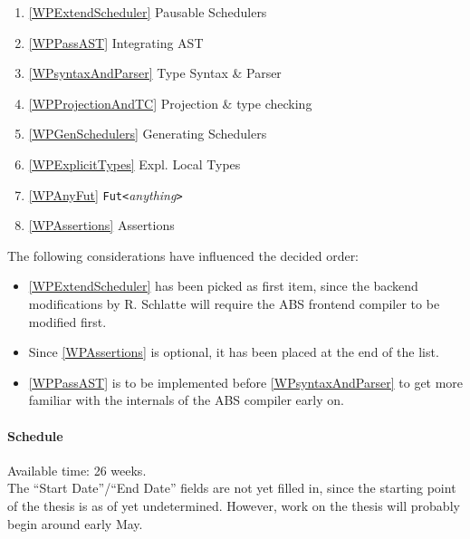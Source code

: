 \documentclass[paper=a4,nochapname,accentcolor=tud9c]{tudexercise}
\begin{document}
\begin{enumerate}[label=(\arabic*)]
  \item \label{orderExtendScheduler} \ref{WPExtendScheduler} Pausable Schedulers
  \item \label{orderPassAST} \ref{WPPassAST} Integrating AST
  \item \label{ordersyntaxAndParser} \ref{WPsyntaxAndParser} Type Syntax \& Parser
  \item \label{orderProjectionAndTC} \ref{WPProjectionAndTC} Projection \& type checking
  \item \label{orderGenSchedulers} \ref{WPGenSchedulers} Generating Schedulers
  \item \label{orderExplicitTypes} \ref{WPExplicitTypes} Expl. Local Types
  \item \label{orderAnyFut} \ref{WPAnyFut} \texttt{Fut<}\emph{anything}\texttt{>}
  \item \label{orderAssertions} \ref{WPAssertions} Assertions
\end{enumerate}

The following considerations have influenced the decided order:
\begin{itemize}
  \item \ref{WPExtendScheduler} has been picked as first item, since the
    backend modifications by R. Schlatte will require the ABS frontend compiler
    to be modified first.
  \item Since \ref{WPAssertions} is optional, it has been placed at the end of
    the list.
  \item \ref{WPPassAST} is to be implemented before \ref{WPsyntaxAndParser} to
    get more familiar with the internals of the ABS compiler early on.
\end{itemize}

\paragraph{Schedule}%
%
Available time: 26 weeks.
\\
The ``Start Date''/``End Date'' fields are not yet filled in, since the
starting point of the thesis is as of yet undetermined.
However, work on the thesis will probably begin around early May.

\medskip
\end{document}
